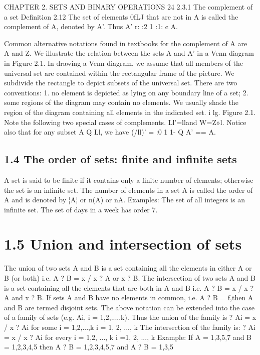 \documentclass{beamer}
\begin{document}
\begin{frame}
CHAPTER 2. SETS AND BINARY OPERATIONS 24
2.3.1 The complement of a set
Deﬁnition 2.12 The set of elements 0fLJ that are not in A is called the complement of A,
denoted by A’. Thus
A’ r: {:2 1 :1: ¢ A}.

Common alternative notations found in textbooks for the complement of A are ~ A and Z.
We illustrate the relation between the sets A and A’ in a Venn diagram in Figure 2.1. In drawing a
Venn diagram, we assume that all members of the universal set are contained within the rectangular
frame of the picture. We subdivide the rectangle to depict subsets of the universal set. There are
two conventions:
1. no element is depicted as lying on any boundary line of a set;
2. some regions of the diagram may contain no elements.
We usually shade the region of the diagram containing all elements in the indicated set. 
i
lg.
Figure 2.1.
Note the following two special cases of complements.
Ll'=lland W=Z»l.
Notice also that for any subset A Q Ll, we have
(/ll)’ = {:0 1 1- Q A'} == A.

\subsection{1.4 The order of sets: finite and infinite sets}
A set is said to be finite if it contains only a finite number of elements;
otherwise the set is an infinite set. The number of elements in a set A is
called the order of A and is denoted by ¦A¦ or n(A) or nA.
Examples:
The set of all integers is an infinite set.
The set of days in a week has order 7.

\section{1.5 Union and intersection of sets}
The union of two sets A and B is a set containing all the elements in
either A or B (or both)
i.e. A ? B = {x / x ? A or x ? B}.
The intersection of two sets A and B is a set containing all the elements
that are both in A and B
i.e. A ? B = {x / x ? A and x ? B}.
If sets A and B have no elements in common, i.e. A ? B = f,then A and B
are termed disjoint sets.
The above notation can be extended into the case of a family of sets (e.g.
Ai, i = 1,2,.....k). Thus the union of the family is
? Ai = {x / x ? Ai for some i = 1,2,...,k}
i = 1, 2, ..., k
The intersection of the family is:
? Ai = {x / x ? Ai for every i = 1,2, ..., k}
i =1, 2, ..., k
Example:
If A = {1,3,5,7} and B = {1,2,3,4,5} then A ? B = {1,2,3,4,5,7} and
A ? B = {1,3,5}

\end{frame}
\end{document}
